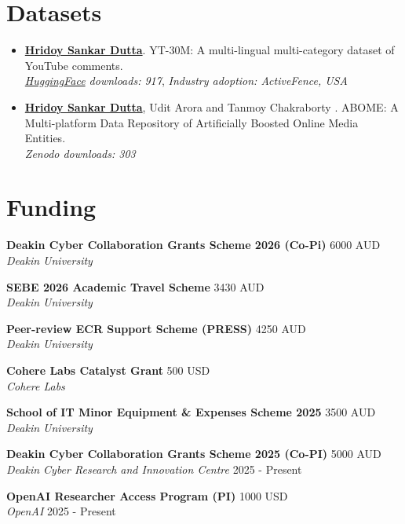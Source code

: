 \documentclass[margin, centered,lmodern]{res}
\begin{document}
\begin{resume}
\section{Datasets}
\begin{itemize}[leftmargin=*]
\item \textbf{\underline{Hridoy Sankar Dutta}}. YT-30M: A multi-lingual multi-category dataset of YouTube comments.\\
\textit{\small{\href{https://huggingface.co/datasets/hridaydutta123/YT-100K/}{HuggingFace} downloads: 917}},
\textit{\small{Industry adoption: ActiveFence, USA}}
\item \textbf{\underline{Hridoy Sankar Dutta}}, Udit Arora and Tanmoy Chakraborty
. ABOME: A Multi-platform Data Repository of Artificially Boosted Online Media Entities.\\
\textit{\small{Zenodo downloads: 303}}
\end{itemize}

\section{Funding}
\textbf{Deakin Cyber Collaboration Grants Scheme 2026 (Co-Pi)} \hfill 6000 AUD  \\
\emph{Deakin University} 

\textbf{SEBE 2026 Academic Travel Scheme} \hfill 3430 AUD  \\
\emph{Deakin University} 

\textbf{Peer-review ECR Support Scheme (PRESS)} \hfill 4250 AUD  \\
\emph{Deakin University} 

\textbf{Cohere Labs Catalyst Grant} \hfill 500 USD  \\
\emph{Cohere Labs} 

\textbf{School of IT Minor Equipment \& Expenses Scheme 2025} \hfill 3500 AUD  \\
\emph{Deakin University} 

\textbf{Deakin Cyber Collaboration Grants Scheme 2025 (Co-PI)} \hfill 5000 AUD  \\
\emph{Deakin Cyber Research and Innovation Centre} \hfill 2025 - Present

\textbf{OpenAI Researcher Access Program (PI)} \hfill 1000 USD  \\
\emph{OpenAI} \hfill 2025 - Present


\end{resume}
\end{document}

